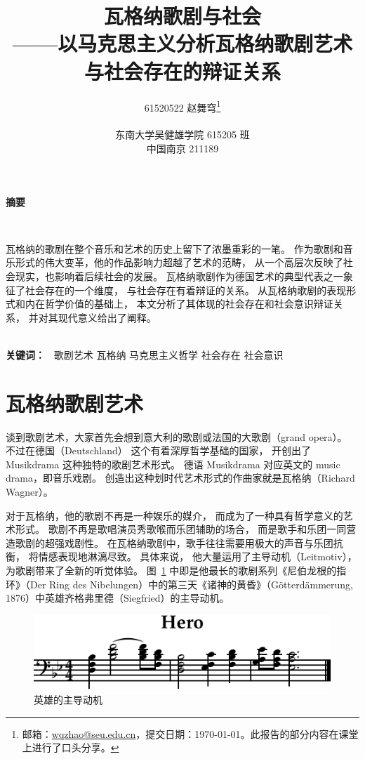 \documentclass[10pt,a4paper,twocolumn]{article}
\title
{
  {\Huge\heiti\bfseries 瓦格纳歌剧与社会}\\
  {\fangsong \Large ——以马克思主义分析瓦格纳歌剧艺术与社会存在的辩证关系}
}
\author
{
  \Large 61520522 赵舞穹\thanks{邮箱：\href{mailto:wqzhao@seu.edu.cn}{wqzhao@seu.edu.cn}，提交日期：\today{}。此报告的部分内容在课堂上进行了口头分享。}\\
  \\
  \normalsize{东南大学吴健雄学院 615205 班}\\
  \normalsize{中国南京 211189}
}
\date{\nonumber}
\begin{document}
  \maketitle
  \begin{strip}
    {
      \centering
      \textbf{\heiti\large 摘要}

      ~

      瓦格纳的歌剧在整个音乐和艺术的历史上留下了浓墨重彩的一笔。
      作为歌剧和音乐形式的伟大变革，他的作品影响力超越了艺术的范畴，
      从一个高层次反映了社会现实，也影响着后续社会的发展。
      瓦格纳歌剧作为德国艺术的典型代表之一象征了社会存在的一个维度，
      与社会存在有着辩证的关系。
      从瓦格纳歌剧的表现形式和内在哲学价值的基础上，
      本文分析了其体现的社会存在和社会意识辩证关系，
      并对其现代意义给出了阐释。
    }
    \\

    \textbf{\heiti 关键词：\ } {\kaishu 歌剧艺术\; 瓦格纳\; 马克思主义哲学\; 社会存在\; 社会意识}\\
  \end{strip}

  \section{瓦格纳歌剧艺术}

    谈到歌剧艺术，大家首先会想到意大利的歌剧或法国的大歌剧（grand opera）。
    不过在德国（Deutschland）
    这个有着深厚哲学基础的国家，
    开创出了 Musikdrama 这种独特的歌剧艺术形式。
    德语 Musikdrama 对应英文的 music drama，即音乐戏剧\cite{vernon2021disturbing}。
    创造出这种划时代艺术形式的作曲家就是瓦格纳（Richard Wagner）。
    
    对于瓦格纳，他的歌剧不再是一种娱乐的媒介，
    而成为了一种具有哲学意义的艺术形式。
    歌剧不再是歌唱演员秀歌喉而乐团辅助的场合，
    而是歌手和乐团一同营造歌剧的超强戏剧性。
    在瓦格纳歌剧中，歌手往往需要用极大的声音与乐团抗衡，
    将情感表现地淋漓尽致。
    具体来说，
    他大量运用了主导动机（Leitmotiv），为歌剧带来了全新的听觉体验。
    图~\ref{fig:hero} 中即是他最长的歌剧系列《尼伯龙根的指环》（Der Ring des Nibelungen）中的第三天《诸神的黄昏》（Götterdämmerung, 1876）中英雄齐格弗里德（Siegfried）的主导动机。
    \begin{figure}[htbp]
      \centering
      \includegraphics{music/hero-crop.pdf}
      \caption{英雄的主导动机\cite{wagner1876gotterdammerung}}
      \label{fig:hero}
    \end{figure}
\end{document}
